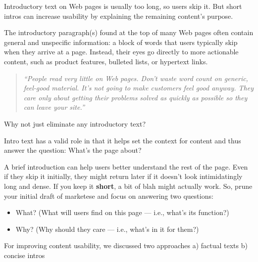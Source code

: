 Introductory text on Web pages is usually too long, so users skip it. But short intros can increase usability by explaining the remaining content's purpose.

The introductory paragraph(s) found at the top of many Web pages often contain general and unspecific information: a block of words that users typically skip when they arrive at a page. Instead, their eyes go directly to more actionable content, such as product features, bulleted lists, or hypertext links.

\begin{quote}
\emph{``People read very little on Web pages. Don't waste word count on generic, feel-good material. It's not going to make customers feel good anyway. They care only about getting their problems solved as quickly as possible so they can leave your site.''}~
\end{quote}

Why not just eliminate any introductory text?

Intro text has a valid role in that it helps set the context for content and thus answer the question: What's the page about?

A brief introduction can help users better understand the rest of the page. Even if they skip it initially, they might return later if it doesn't look intimidatingly long and dense. If you keep it \textbf{short}, a bit of blah might actually work. So, prune your initial draft of marketese and focus on answering two questions:

\begin{itemize}
	\item What? (What will users find on this page --- i.e., what's its function?)
	\item Why? (Why should they care --- i.e., what's in it for them?)
\end{itemize}

For improving content usability, we discussed two approaches
a) factual texts
b) concise intros

